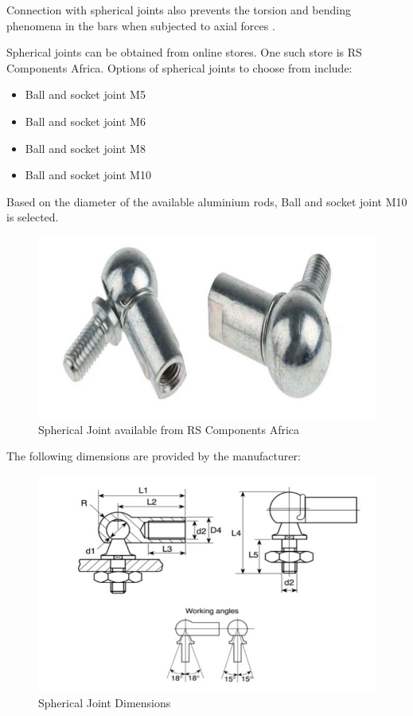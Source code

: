 Connection with spherical joints also prevents the torsion and bending phenomena in the bars when subjected to axial forces \cite{fernandes_design_nodate}.

Spherical joints can be obtained from online stores. One such store is RS Components Africa. Options of spherical joints to choose from include:
\begin{itemize}
\item Ball and socket joint M5
\item Ball and socket joint M6
\item Ball and socket joint M8
\item Ball and socket joint M10
\end{itemize}
Based on the diameter of the available aluminium rods, Ball and socket joint M10 is selected.
\begin{center}
	\begin{figure}[H]
	\centering
	\includegraphics[width=0.6\linewidth]{Figures/Spherical}
	\caption[Spherical Joint]{Spherical Joint available from RS Components Africa \cite{datasheet_spherical}}
	\end{figure}
\end{center}
The following dimensions are provided by the manufacturer:
\begin{center}
	\begin{figure}[H]
	\centering
	\includegraphics[width=0.8\linewidth]{Figures/Spherical Dimensions}
	\caption[Spherical Joint Dimensions]{Spherical Joint Dimensions \cite{datasheet_spherical}}
	\end{figure}
\end{center}
